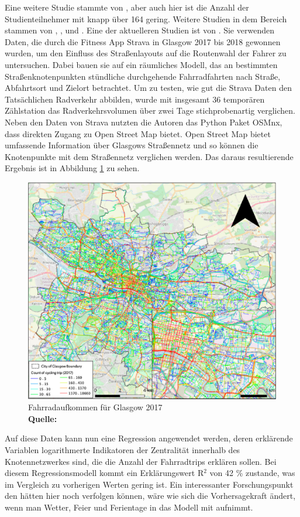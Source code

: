 \documentclass[a4paper,12pt]{thesis}
\newcommand*{\captionsource}[2]{%
	\caption[{#1}]{%
		#1%
		\\\hspace{\linewidth}%
		\textbf{Quelle:} #2%
	}%
}
\begin{document}
Eine weitere Studie stammte von \cite{Broach2012}, aber auch hier ist die Anzahl der Studienteilnehmer mit knapp über 164 gering. Weitere Studien in dem Bereich stammen von \cite{Musakwa2016}, \cite{Pritchard2018}, \cite{Lee2020} und \cite{Alattar2021}. Eine der aktuelleren Studien ist von \cite{Alattar2021}. Sie verwenden Daten, die durch die Fitness App Strava in Glasgow 2017 bis 2018 gewonnen wurden, um den Einfluss des Straßenlayouts auf die Routenwahl der Fahrer zu untersuchen. Dabei bauen sie auf ein räumliches Modell, das an bestimmten Straßenknotenpunkten stündliche durchgehende Fahrradfahrten nach Straße, Abfahrtsort und Zielort betrachtet. Um zu testen, wie gut die Strava Daten den Tatsächlichen Radverkehr abbilden, wurde mit insgesamt 36 temporären Zählstation das Radverkehrsvolumen über zwei Tage stichprobenartig verglichen. Neben den Daten von Strava nutzten die Autoren das Python Paket OSMnx, dass direkten Zugang zu Open Street Map bietet. Open Street Map bietet umfassende Information über Glasgows Straßennetz und so können die Knotenpunkte mit dem Straßennetz verglichen werden. Das daraus resultierende Ergebnis ist in Abbildung \ref{Alattar_2021} zu sehen.
\begin{figure}[!ht]
	\centering
	\includegraphics[width=\textwidth]{Plots/Alattar2021.png}
	\captionsource{Fahrradaufkommen für Glasgow 2017}{
		\cite{Alattar2021}
	}
	\label{Alattar_2021}
\end{figure}
Auf diese Daten kann nun eine Regression angewendet werden, deren erklärende Variablen logarithmerte Indikatoren der Zentralität innerhalb des Knotennetzwerkes sind, die die Anzahl der Fahrradtrips erklären sollen. Bei diesem Regressionsmodell kommt ein Erklärungswert R$^2$ von 42 \% zustande, was im Vergleich zu vorherigen Werten gering ist. Ein interessanter Forschungspunkt den \cite{Alattar2021} hätten hier noch verfolgen können, wäre wie sich die Vorhersagekraft ändert, wenn man Wetter, Feier und Ferientage in das Modell mit aufnimmt.\\
\end{document}
